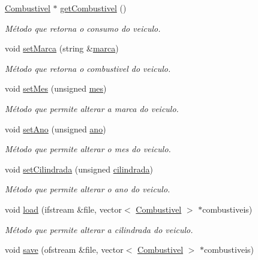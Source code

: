 \begin{DoxyCompactItemize}
\hyperlink{class_combustivel}{Combustivel} $\ast$ \hyperlink{class_veiculo_a2198e13a144ece6d32634dd6bdb160c9}{get\+Combustivel} ()
\begin{DoxyCompactList}\small\item\em Método que retorna o consumo do veiculo. \end{DoxyCompactList}\item 
void \hyperlink{class_veiculo_a4376b75295af584bea72db312e909d52}{set\+Marca} (string \&\hyperlink{class_veiculo_ab20b89442a0ddaedd074bb0de75838c8}{marca})
\begin{DoxyCompactList}\small\item\em Método que retorna o combustivel do veiculo. \end{DoxyCompactList}\item 
void \hyperlink{class_veiculo_abce426bdb78d81f59e4bd3de01b05fea}{set\+Mes} (unsigned \hyperlink{class_veiculo_ac4146f7b3d38e31e3225074e0fb0dea9}{mes})
\begin{DoxyCompactList}\small\item\em Método que permite alterar a marca do veiculo. \end{DoxyCompactList}\item 
void \hyperlink{class_veiculo_ad71370069a5a0f587fced2c49028cdfa}{set\+Ano} (unsigned \hyperlink{class_veiculo_ae141824a9353b3f7ed99d5c34c830fe2}{ano})
\begin{DoxyCompactList}\small\item\em Método que permite alterar o mes do veiculo. \end{DoxyCompactList}\item 
void \hyperlink{class_veiculo_ad41e09a8864fc77143c30218c2441f77}{set\+Cilindrada} (unsigned \hyperlink{class_veiculo_a3c3b3f2f958a98b48fa5e4f46007c9f9}{cilindrada})
\begin{DoxyCompactList}\small\item\em Método que permite alterar o ano do veiculo. \end{DoxyCompactList}\item 
void \hyperlink{class_veiculo_a1e72c5592016f150fec8fcede73eb536}{load} (ifstream \&file, vector$<$ \hyperlink{class_combustivel}{Combustivel} $>$ $\ast$combustiveis)
\begin{DoxyCompactList}\small\item\em Método que permite alterar a cilindrada do veiculo. \end{DoxyCompactList}\item 
void \hyperlink{class_veiculo_a9f7396b5b6ba78f18b16192e38f501df}{save} (ofstream \&file, vector$<$ \hyperlink{class_combustivel}{Combustivel} $>$ $\ast$combustiveis)

\end{DoxyCompactItemize}
